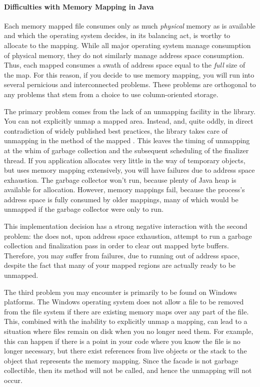 \paragraph{Difficulties with Memory Mapping in Java}

Each memory mapped file consumes only as much \emph{physical} memory as is
available and which the operating system decides, in its balancing act, is worthy
to allocate to the mapping. While all major operating system manage consumption
of physical memory, they do not similarly manage address space consumption. Thus,
each mapped  consumes a swath of address space equal to the
\emph{full} size of the map. For this reason, if you decide to use memory
mapping, you will run into several pernicious and interconnected problems. These
problems are orthogonal to any problems that stem from a choice to use
column-oriented storage.

The primary problem comes from the lack of an unmapping facility in the
 library. You can not explicitly unmap a mapped area. Instead,
and, quite oddly, in direct contradiction of widely published best practices, the
library takes care of unmapping in the  method of the mapped
. This leaves the timing of unmapping at the whim of garbage
collection and the subsequent scheduling of the finalizer thread. If you
application allocates very little in the way of temporary objects, but uses
memory mapping extensively, you will have failures due to address space
exhaustion. The garbage collector won't run, because plenty of Java heap is
available for allocation. However, memory mappings fail, because the process's
address space is fully consumed by older mappings, many of which would be
unmapped if the garbage collector were only to run.

This implementation decision has a strong negative interaction with the second
problem: the \jre does not, upon address space exhaustion, attempt to run a
garbage collection and finalization pass in order to clear out mapped byte
buffers. Therefore, you may suffer from  failures,
due to running out of address space, despite the fact that many of your mapped
regions are actually ready to be unmapped.

The third problem you may encounter is primarily to be found on Windows
platforms. The Windows operating system does not allow a file to be removed from
the file system if there are existing memory maps over any part of the file.
This, combined with the inability to explicitly unmap a mapping, can lead to a
situation where files remain on disk when you no longer need them. For example,
this can happen if there is a point in your code where you know the file is no
longer necessary, but there exist references from live objects or the stack to
the  object that represents the memory mapping. Since the
 facade is not garbage collectible, then its 
method will not be called, and hence the unmapping will not occur.

